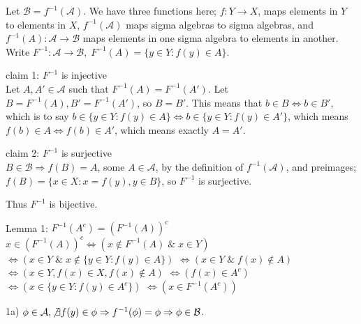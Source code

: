 \documentclass[12pt]{article}
\begin{document}
\begin{flushleft}
Let $\mathcal{B} = f^{-1}(\mathcal{A})$. We have three functions here; $f: Y \rightarrow X$, maps elements in $Y$ to elements in $X$, $f^{-1}(\mathcal{A})$ maps sigma algebras to sigma algebras, and $f^{-1}(A): \mathcal{A} \rightarrow \mathcal{B}$ maps elements in one sigma algebra to elements in another. Write $F^{-1}: \mathcal{A} \rightarrow \mathcal{B}, \; F^{-1}(A) = \{ y \in Y : f(y) \in A \}$.
\end{flushleft}

\begin{flushleft}
claim 1: $F^{-1}$ is injective\\
Let $A,A' \in \mathcal{A}$ such that $F^{-1}(A) = F^{-1} (A')$. Let $B=F^{-1}(A), B' = F^{-1}(A')$, so $B=B'$. This means that $b \in B \Leftrightarrow b \in B'$, which is to say $b \in \{ y \in Y : f(y) \in A \} \Leftrightarrow b \in \{ y \in Y : f(y) \in A' \}$, which means $f(b) \in A \Leftrightarrow f(b) \in A'$, which means exactly $A=A'$.
\end{flushleft}

\begin{flushleft}
claim 2: $F^{-1}$ is surjective\\
$B \in \mathcal{B} \Rightarrow f(B) = A$, some $A \in \mathcal{A}$, by the definition of $f^{-1}(\mathcal{A})$, and preimages; $f(B) = \{ x \in X : x = f(y), y \in B \}$, so $F^{-1}$ is surjective.
\end{flushleft}

\begin{flushleft}
Thus $F^{-1}$ is bijective. 
\end{flushleft}

\begin{flushleft}
Lemma 1: $F^{-1}(A^c) = (F^{-1}(A))^c$\\
$x \in (F^{-1}(A))^c \Leftrightarrow \left( x \not \in F^{-1}(A) \;\&\; x \in Y \right) $ 
$\Leftrightarrow \left(  x \in Y \;\&\; x \not \in \{ y \in Y: f(y) \in A \} \right) $
$ \Leftrightarrow \left( x \in Y \;\&\; f(x) \not \in A \right) $
$ \Leftrightarrow \left( x \in Y, f(x) \in X, f(x) \not \in A \right) $
$ \Leftrightarrow \left(  f(x) \in A^c  \right) $
$ \Leftrightarrow \left(  x \in \{ y \in Y: f(y) \in A^c   \}  \right) $
$ \Leftrightarrow \left(  x \in F^{-1}(A^c) \right) $
\end{flushleft}


\begin{flushleft}
1a) $\phi \in \mathcal{A}, \not \exists f(y) \in \phi \Rightarrow f^{-1}(\phi) = \phi \Rightarrow \phi \in \mathcal{B}$.
\end{flushleft}
\end{document}
